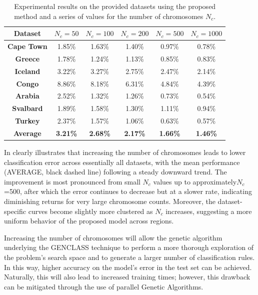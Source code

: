 \documentclass[12pt]{Definitions/academia}
\begin{document}
\begin{table}[H]
	\centering
\begin{tabular}{|c|c|c|c|c|c|}
\hline
\textbf{Dataset} & \textbf{$N_{c}=50$} & \textbf{$N_{c}=100$} & \textbf{$N_{c}=200$} & \textbf{$N_{c}=500$} & \textbf{$N_{c}=1000$}\tabularnewline
\hline
\hline
\textbf{Cape Town} & 1.85\% & 1.63\% & 1.40\% & 0.97\% & 0.78\%\tabularnewline
\hline
\textbf{Greece} & 1.78\% & 1.24\% & 1.13\% & 0.85\% & 0.83\%\tabularnewline
\hline
\textbf{Iceland} & 3.22\% & 3.27\% & 2.75\% & 2.47\% & 2.14\%\tabularnewline
\hline
\textbf{Congo} & 8.86\% & 8.18\% & 6.31\% & 4.84\% & 4.39\%\tabularnewline
\hline
\textbf{Arabia} & 2.52\% & 1.32\% & 1.26\% & 0.73\% & 0.54\%\tabularnewline
\hline
\textbf{Svalbard} & 1.89\% & 1.58\% & 1.30\% & 1.11\% & 0.94\%\tabularnewline
\hline
\textbf{Turkey} & 2.37\% & 1.57\% & 1.06\% & 0.63\% & 0.57\%\tabularnewline
\hline
\textbf{Average} & \textbf{3.21\%} & \textbf{2.68\%} & \textbf{2.17\%} & \textbf{1.66\%} & \textbf{1.46\%}\tabularnewline
\hline
\end{tabular}
\vspace{1em}
\caption{Experimental results on the provided datasets using the proposed method
and a series of values for the number of chromosomes $N_{c}$.\label{tab:Table-7-Experimental-results-on-1}}
\end{table}

\clearpage
In  clearly illustrates that increasing the
number of chromosomes leads to lower classification error across essentially
all datasets, with the mean performance (AVERAGE, black dashed line)
following a steady downward trend. The improvement is most pronounced
from small $N_{c}$ values up to approximately$N_{c}$=500, after
which the error continues to decrease but at a slower rate, indicating
diminishing returns for very large chromosome counts. Moreover, the
dataset-specific curves become slightly more clustered as $N_{c}$
increases, suggesting a more uniform behavior of the proposed model
across regions.

Increasing the number of chromosomes will allow the genetic algorithm
underlying the GENCLASS technique to perform a more thorough exploration
of the problem\textquoteright s search space and to generate a larger
number of classification rules. In this way, higher accuracy on the
model\textquoteright s error in the test set can be achieved. Naturally,
this will also lead to increased training times; however, this drawback
can be mitigated through the use of parallel Genetic Algorithms.
\end{document}
